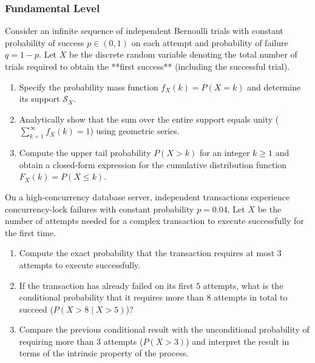 \subsubsection*{Fundamental Level}

\begin{problema}
	\label{prob:3.5.1}
	Consider an infinite sequence of independent Bernoulli trials with constant probability of success $p \in (0, 1)$ on each attempt and probability of failure $q = 1-p$. Let $X$ be the discrete random variable denoting the total number of trials required to obtain the **first success** (including the successful trial).
	\begin{enumerate}
		\item Specify the probability mass function $f_X(k) = P(X = k)$ and determine its support $\mathcal{S}_X$.
		\item Analytically show that the sum over the entire support equals unity ($\sum_{k=1}^{\infty} f_X(k) = 1$) using geometric series.
		\item Compute the upper tail probability $P(X > k)$ for an integer $k \ge 1$ and obtain a closed-form expression for the cumulative distribution function $F_X(k) = P(X \le k)$.
	\end{enumerate}
\end{problema}

\begin{problema}
	\label{prob:3.5.2}
	On a high-concurrency database server, independent transactions experience concurrency-lock failures with constant probability $p = 0.04$. Let $X$ be the number of attempts needed for a complex transaction to execute successfully for the first time.
	\begin{enumerate}
		\item Compute the exact probability that the transaction requires at most $3$ attempts to execute successfully.
		\item If the transaction has already failed on its first $5$ attempts, what is the conditional probability that it requires more than $8$ attempts in total to succeed ($P(X > 8 \mid X > 5)$)?
		\item Compare the previous conditional result with the unconditional probability of requiring more than $3$ attempts ($P(X > 3)$) and interpret the result in terms of the intrinsic property of the process.
	\end{enumerate}
\end{problema}

